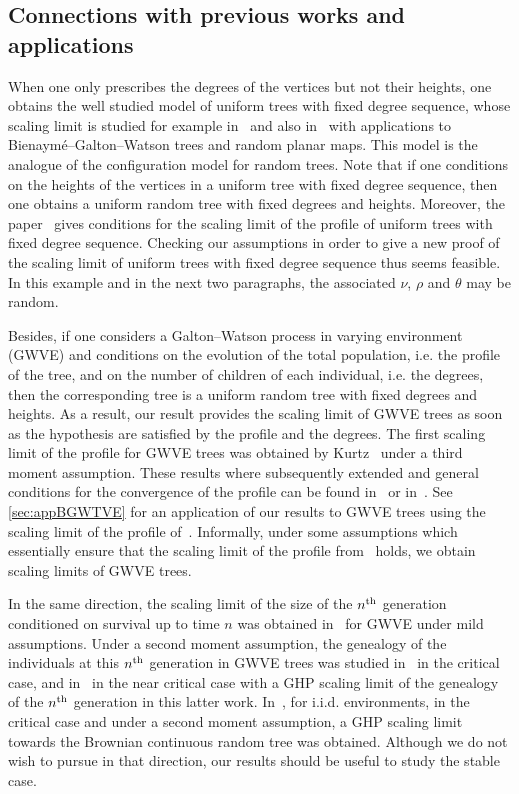 \documentclass[10pt]{amsart}
\theoremstyle{definition}\newtheorem{defi}[theo]{Definition}\newtheorem{rema}[theo]{Remark}\newtheorem{exam}[theo]{Example}\newtheorem{exem}[theo]{Example}\newtheorem{nota}[theo]{Notation}
\newcommand{\1}{\mathbbm{1}}
\begin{document}
\subsection{Connections with previous works and applications}

When one only prescribes the degrees of the vertices but not their heights, one obtains the well studied model of uniform trees with fixed degree sequence, whose scaling limit is studied for example in~\cite{BM14,BR21} and also in~\cite{Mar18} with applications to Bienaymé--Galton--Watson trees and random planar maps. This model is the analogue of the configuration model for random trees. Note that if one conditions on the heights of the vertices in a uniform tree with fixed degree sequence, then one obtains a uniform random tree with fixed degrees and heights. Moreover, the paper~\cite{AUB20} gives conditions for the scaling limit of the profile of uniform trees with fixed degree sequence. Checking our assumptions in order to give a new proof of the scaling limit of uniform trees with fixed degree sequence thus seems feasible. In this example and in the next two paragraphs, the associated $\nu$, $\rho$ and $\theta$ may be random.

Besides, if one considers a Galton--Watson process in varying environment (GWVE) and conditions on the evolution of the total population, i.e. the profile of the tree, and on the number of children of each individual, i.e. the degrees, then the corresponding tree is a uniform random tree with fixed degrees and heights. As a result, our result provides the scaling limit of GWVE trees as soon as the hypothesis are satisfied by the profile and the degrees. The first scaling limit of the profile for GWVE trees was obtained by Kurtz~\cite{Kur78} under a third moment assumption. These results where subsequently extended and general conditions for the convergence of the profile can be found in~\cite{BS15} or in~\cite{FLL22}. See \cref{sec:appBGWTVE} for an application of our results to GWVE trees using the scaling limit of the profile of~\cite{BS15}. Informally, under some assumptions which essentially ensure that the scaling limit of the profile from~\cite{BS15} holds, we obtain scaling limits of GWVE trees.

In the same direction, the scaling limit of the size of the $n^{\rm th}$ generation conditioned on survival up to time $n$ was obtained in~\cite{Ker20} for GWVE under mild assumptions. Under a second moment assumption, the genealogy of the individuals at this $n^{\rm th}$ generation in GWVE trees was studied in~\cite{HPP22} in the critical case, and in~\cite{BFRS22} in the near critical case with a GHP scaling limit of the genealogy of the $n^{\rm th}$ generation in this latter work. In~\cite{CKKM22}, for i.i.d. environments, in the critical case and under a second moment assumption, a GHP scaling limit towards the Brownian continuous random tree was obtained. Although we do not wish to pursue in that direction, our results should be useful to study the stable case.
\end{document}
